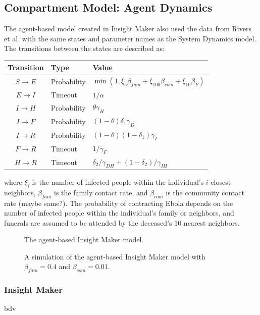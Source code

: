 \documentclass[10pt]{article}
\begin{document}
\subsection{Compartment Model: Agent Dynamics}
The agent-based model created in Insight Maker also used the data from Rivers et al. with the same states and parameter names as the System Dynamics model. The transitions between the states are described as:\\

\begin{table}[ht]
\begin{center}
\begin{tabular}{c | l | l}
{\bf Transition} & {\bf Type } & {\bf Value}\\\hline
$S\rightarrow E$ & Probability & $\min(1,\xi_5\beta_{fam}+\xi_{100}\beta_{com}+\xi_{10}\beta_F)$\\
$E\rightarrow I$ & Timeout & $1/\alpha$\\
$I\rightarrow H$ & Probability & $\theta\gamma_H$\\
$I\rightarrow F$ & Probability & $(1-\theta)\delta_1\gamma_D$\\
$I\rightarrow R$ & Probability & $(1-\theta)(1-\delta_{1})\gamma_I$\\
$F\rightarrow R$ & Timeout & ${1}/{\gamma_{F}}$\\
$H\rightarrow R$ & Timeout & $\delta_{2}/{\gamma_{DH}} + (1-\delta_{2})/{\gamma_{IH}}$\\
\end{tabular}
\end{center}
\end{table}
\noindent where $\xi_{i}$ is the number of infected people within the individual's $i$ closest neighbors, $\beta_{fam}$ is the family contact rate, and $\beta_{com}$ is the community contact rate (maybe same?). The probability of contracting Ebola depends on the number of infected people within the individual's family or neighbors, and funerals are assumed to be attended by the deceased's 10 nearest neighbors.

\begin{figure}
\caption{The agent-based Insight Maker model.}
\end{figure}

\begin{figure}
\caption{A simulation of the agent-based Insight Maker model with $\beta_{fam}=0.4$ and $\beta_{com}=0.01$.}
\end{figure}

\subsubsection{Insight Maker}
bdv
\end{document}
